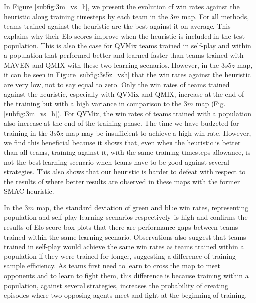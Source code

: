 In Figure \ref{subfig:3m_vs_h}, we present the evolution of win rates against the heuristic along training timesteps by each team in the $3m$ map.
For all methods, teams trained against the heuristic are the best against it on average.
This explains why their Elo scores improve when the heuristic is included in the test population.
This is also the case for QVMix teams trained in self-play and within a population that performed better and learned faster than teams trained with MAVEN and QMIX with these two learning scenarios.
However, in the $3s5z$ map, it can be seen in Figure \ref{subfig:3s5z_vsh} that the win rates against the heuristic are very low, not to say equal to zero.
Only the win rates of teams trained against the heuristic, especially with QVMix and QMIX, increase at the end of the training but with a high variance in comparison to the $3m$ map (Fig. \ref{subfig:3m_vs_h}).
For QVMix, the win rates of teams trained with a population also increase at the end of the training phase.
The time we have budgeted for training in the $3s5z$ map may be insufficient to achieve a high win rate.
However, we find this beneficial because it shows that, even when the heuristic is better than all teams, training against it, with the same training timesteps allowance, is not the best learning scenario when teams have to be good against several strategies.
This also shows that our heuristic is harder to defeat with respect to the results of \citep{Rashid2018,Mahajan2019MAVEN:Exploration,leroy2020qvmix} where better results are observed in these maps with the former SMAC heuristic.

In the $3m$ map, the standard deviation of green and blue win rates, representing population and self-play learning scenarios respectively, is high and confirms the results of Elo score box plots that there are performance gaps between teams trained within the same learning scenario.
Observations also suggest that teams trained in self-play would achieve the same win rates as teams trained within a population if they were trained for longer, suggesting a difference of training sample efficiency.
As teams first need to learn to cross the map to meet opponents and to learn to fight them, this difference is because training within a population, against several strategies, increases the probability of creating episodes where two opposing agents meet and fight at the beginning of training.

